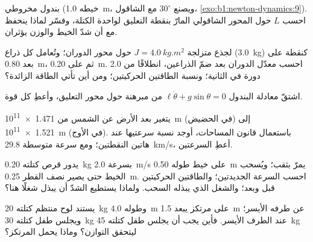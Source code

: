 \begin{exercise}[$\star$]\label{exo:b1:angular-momentum:3}
بندول مخروطي (خيطه \qty{1.0}{m}، ويصنع $30^\circ$ مع الشاقول،
\cref{exo:b1:newton-dynamics:9}). احسب $L$ حول المحور الشاقولي
المارّ بنقطة التعليق لواحدة الكتلة، وفسّر لماذا ينحفظ
مع أن شدّ الخيط والوزن يؤثران.
\end{exercise}

\begin{exercise}[$\star$]\label{exo:b1:angular-momentum:4}
لجذع متزلجة $J = \qty{4.0}{kg.m^2}$ حول محور الدوران؛ وتُعامل كل
ذراع (\qty{3.0}{kg}) كنقطة على بعد \qty{0.80}{m}، ثم على
\qty{0.20}{m}. احسب معدّل الدوران بعد ضمّ الذراعين، انطلاقًا من
\qty{2.0}{} دورة في الثانية؛ ونسبة الطاقتين الحركيتين؛ ومن أين تأتي
الطاقة الزائدة؟
\end{exercise}

\begin{exercise}[$\star\star$]\label{exo:b1:angular-momentum:5}
اشتقّ معادلة البندول $\ell\ddot\theta + g\sin\theta = 0$ من
مبرهنة  حول محور التعليق، وأعطِ 
كل قوة.
\end{exercise}

\begin{exercise}[$\star\star$]\label{exo:b1:angular-momentum:6}
يتغير بعد الأرض عن الشمس من \qty{1.471e11}{m} (في الحضيض)
إلى \qty{1.521e11}{m} (في الأوج). باستعمال قانون المساحات، أوجد نسبة
سرعتيها عند هاتين النقطتين؛ ومع سرعة متوسطة \qty{29.8}{km/s}،
أعطِ السرعتين.
\end{exercise}

\begin{exercise}[$\star\star$]\label{exo:b1:angular-momentum:7}
يدور قرص كتلته \qty{0.20}{kg} بسرعة \qty{2.0}{m/s} على خيط طوله \qty{0.50}{m}
يمرّ بثقب؛ ويُسحب الخيط حتى يصير نصف القطر \qty{0.25}{m}.
احسب السرعة  الجديدتين؛ والطاقتين الحركيتين قبل وبعد؛ والشغل
الذي يبذله السحب. ولماذا يستطيع الشدّ أن يبذل شغلًا هنا؟
\end{exercise}

\begin{exercise}[$\star\star$]\label{exo:b1:angular-momentum:8}
يستند لوح منتظم كتلته \qty{20}{kg} وطوله \qty{4.0}{m} على
مرتكز يبعد \qty{1.5}{m} عن طرفه الأيسر؛ ويجلس طفل كتلته \qty{30}{kg} عند
الطرف الأيسر. فأين يجب أن يجلس طفل كتلته \qty{45}{kg} ليتحقق التوازن؟ وماذا
يحمل المرتكز؟
\end{exercise}

